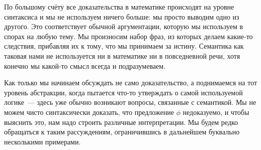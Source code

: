 По большому счёту все доказательства в математике происходят на уровне синтаксиса и мы не используем ничего больше: мы просто выводим одно из другого. Это соответствует обычной аргументации, которую мы используем в спорах на любую тему. Мы произносим набор фраз, из которых делаем какие-то следствия, прибавляя их к тому, что мы принимаем за истину. Семантика как таковая нами не используется ни в математике ни в повседневной речи, хотя конечно мы какой-то смысл всегда и подразумеваем.

Как только мы начинаем обсуждать не само доказательство, а поднимаемся на тот уровень абстракции, когда пытается что-то утверждать о самой используемой логике~--- здесь уже обычно возникают вопросы, связанные с семантикой. Мы не можем чисто синтаксически доказать, что предложение $\phi$ недоказуемо, и чтобы выяснить это, нам надо строить различные интерпретации. Мы будем редко обращаться к таким рассуждениям, ограничившись в дальнейшем буквально несколькими примерами.
